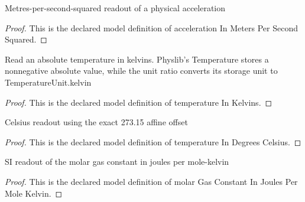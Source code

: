 \begin{definition}
  \label{def:physics:phyx-mini-0374:phyxminiproblems-problemphyxmini0374-accelerationinmeterspersecondsquared}
  Metres-per-second-squared readout of a physical acceleration
\end{definition}
\begin{proof}
  This is the declared model definition of acceleration In Meters Per Second Squared.
\end{proof}
\begin{definition}
  \label{def:physics:phyx-mini-0374:phyxminiproblems-problemphyxmini0374-temperatureinkelvins}
  Read an absolute temperature in kelvins. Physlib's Temperature stores a nonnegative absolute value, while the unit ratio converts its storage unit to TemperatureUnit.kelvin
\end{definition}
\begin{proof}
  This is the declared model definition of temperature In Kelvins.
\end{proof}
\begin{definition}
  \label{def:physics:phyx-mini-0374:phyxminiproblems-problemphyxmini0374-temperatureindegreescelsius}
  Celsius readout using the exact 273.15 affine offset
\end{definition}
\begin{proof}
  This is the declared model definition of temperature In Degrees Celsius.
\end{proof}
\begin{definition}
  \label{def:physics:phyx-mini-0374:phyxminiproblems-problemphyxmini0374-molargasconstantinjoulespermolekelvin}
  SI readout of the molar gas constant in joules per mole-kelvin
\end{definition}
\begin{proof}
  This is the declared model definition of molar Gas Constant In Joules Per Mole Kelvin.
\end{proof}
